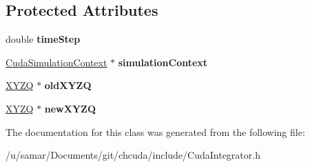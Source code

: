 \subsection*{Protected Attributes}
\begin{DoxyCompactItemize}
\item 
\hypertarget{classCudaIntegrator_a8099cf8ab53d97b86623f0dd69c21510}{}\label{classCudaIntegrator_a8099cf8ab53d97b86623f0dd69c21510} 
double {\bfseries time\+Step}
\item 
\hypertarget{classCudaIntegrator_ae67486fba39d17c10f8274f4f41ef86a}{}\label{classCudaIntegrator_ae67486fba39d17c10f8274f4f41ef86a} 
\hyperlink{classCudaSimulationContext}{Cuda\+Simulation\+Context} $\ast$ {\bfseries simulation\+Context}
\item 
\hypertarget{classCudaIntegrator_ae792b058acda2cea2bed9938a75ba17f}{}\label{classCudaIntegrator_ae792b058acda2cea2bed9938a75ba17f} 
\hyperlink{classXYZQ}{X\+Y\+ZQ} $\ast$ {\bfseries old\+X\+Y\+ZQ}
\item 
\hypertarget{classCudaIntegrator_a15a43a80efa6fd81a1d7f922282c4c29}{}\label{classCudaIntegrator_a15a43a80efa6fd81a1d7f922282c4c29} 
\hyperlink{classXYZQ}{X\+Y\+ZQ} $\ast$ {\bfseries new\+X\+Y\+ZQ}
\end{DoxyCompactItemize}


The documentation for this class was generated from the following file\+:\begin{DoxyCompactItemize}
\item 
/u/samar/\+Documents/git/chcuda/include/Cuda\+Integrator.\+h\end{DoxyCompactItemize}
